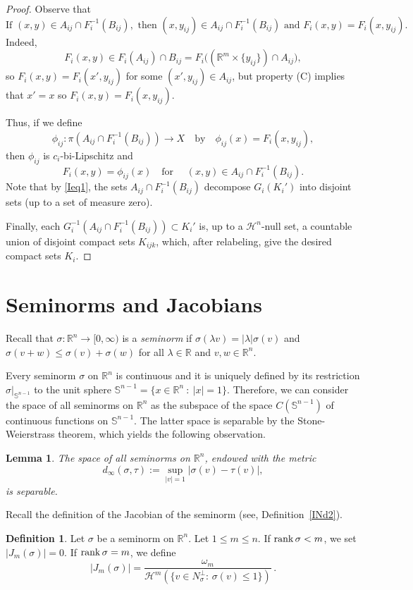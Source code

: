 \documentclass[12pt,leqno]{amsart}
\newtheorem{lemma}[theorem]{Lemma}
\theoremstyle{definition}
\newtheorem{remark}[theorem]{Remark}
\newtheorem{definition}[theorem]{Definition}
\newcommand{\bbbr}{\mathbb R}
\newcommand{\Sph}{\mathbb S}
\def\H{{\mathcal H}}
\def\rank{{\rm rank\,}}
\numberwithin{theorem}{section} \numberwithin{equation}{section}
\begin{document}
\begin{proof}
Observe that
$$
\text{If } (x,y)\in A_{ij}\cap F_i^{-1}(B_{ij}), \text{ then } (x,y_{ij}) \in A_{ij}\cap F_i^{-1}(B_{ij}) \text{ and }
F_i(x,y)=F_i(x,y_{ij}).
$$
Indeed,
$$
F_i(x,y)\in F_i(A_{ij})\cap B_{ij}=F_i\big((\bbbr^m\times\{ y_{ij}\})\cap A_{ij}\big),
$$
so $F_i(x,y)=F_i(x',y_{ij})$ for some $(x',y_{ij})\in A_{ij}$, but property (C) implies that $x'=x$ so
$F_i(x,y)=F_i(x,y_{ij})$.

Thus, if we define
$$
\phi_{ij}:\pi(A_{ij}\cap F_i^{-1}(B_{ij}))\to X
\quad
\text{by}
\quad
\phi_{ij}(x)=F_i(x,y_{ij}),
$$
then $\phi_{ij}$ is $c_i$-bi-Lipschitz and
$$
F_i(x,y)=\phi_{ij}(x)
\quad
\text{for }
\quad
(x,y)\in A_{ij}\cap F_i^{-1}(B_{ij}).
$$
Note that by \eqref{Ieq1}, the sets $A_{ij}\cap F_i^{-1}(B_{ij})$ decompose $G_i(K_i')$ into disjoint sets (up to a set of measure zero).

Finally, each $G_i^{-1}(A_{ij}\cap F_i^{-1}(B_{ij}))\subset K_i'$ is, up to a $\H^n$-null set, a countable union of disjoint compact sets $K_{ijk}$, which, after relabeling, give the desired compact sets $K_i$.
\end{proof}


\section{Seminorms and Jacobians}
\label{SJ}
Recall that $\sigma:\bbbr^n\to [0,\infty)$ is a \emph{seminorm} if $\sigma(\lambda v)=|\lambda|\sigma(v)$ and $\sigma(v+w)\leq \sigma(v)+\sigma(w)$ for all $\lambda\in\bbbr$ and $v,w\in\bbbr^n$.

Every seminorm $\sigma$ on $\bbbr^n$ is continuous and it is uniquely defined by its restriction $\sigma|_{\Sph^{n-1}}$ to the unit sphere $\Sph^{n-1}=\{x\in\bbbr^n~:~|x|=1\}$. Therefore, we can consider the space of all seminorms on $\bbbr^n$ as the subspace of the space $C(\Sph^{n-1})$ of continuous functions on $\Sph^{n-1}$. The latter space is separable by the Stone-Weierstrass theorem, which yields the following observation.

\begin{lemma}
\label{lem:semi sep}
The space of all seminorms on $\bbbr^n$, endowed with the metric
$$
d_\infty(\sigma,\tau):=\sup_{|v|=1} |\sigma(v)-\tau(v)|,
$$
is separable.
\end{lemma}
Recall the definition of the Jacobian of the seminorm (see, Definition~\ref{INd2}).
\begin{definition}
Let $\sigma$ be a seminorm on $\bbbr^n$.
Let $1\leq m\leq n$. If $\rank\sigma<m$, we set $|J_m(\sigma)|=0$. If $\rank\sigma=m$, we define
\begin{equation}
\label{SJeq1}
|J_m(\sigma)|=\frac{\omega_m}{\H^m(\{v\in N_\sigma^\perp:\, \sigma(v)\leq 1\})}\, .
\end{equation}
\end{definition}
\end{document}
